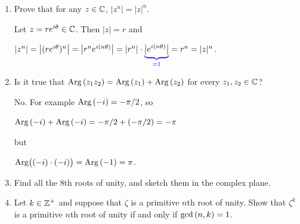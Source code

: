 \documentclass[11pt,fleqn,dvipsnames,usenames]{article}
\begin{document}
\begin{enumerate}
\item Prove that for any $z\in\mathbb{C}$, $|z^{n}| = |z|^{n}$.
\vsmsp

\solution Let $z = re^{i\theta}\in\mathbb{C}$.  Then $|z| = r$ and
\begin{center}
$|z^n| = \big|(re^{i\theta})^n\big| = \big|r^ne^{i(n\theta)}\big| = |r^n|\cdot {\color{blue}\underbrace{\color{black}\big|e^{i(n\theta)}\big|}_{=1}} = r^n  = |z|^n$.
\end{center}
\item Is it true that $\text{Arg}\left(z_1z_2\right) = \text{Arg}\left(z_1\right) + \text{Arg}\left(z_2\right)$ for every $z_{1},z_{2}\in\mathbb{C}$?
\vsmsp

\solution No.  For example $\text{Arg}\left(-i\right) = -\pi/2$, so
\begin{center}
$\text{Arg}\left(-i\right) + \text{Arg}\left(-i\right) = -\pi/2 + (-\pi/2) = -\pi$
\end{center}
but
\begin{center}
$\text{Arg}\big((-i)\cdot(-i)\big) = \text{Arg}\left(-1\right) = \pi$.
\end{center}
\item Find all the $8$th roots of unity, and sketch them in the complex plane.
\item Let $k\in\mathbb{Z}^{+}$ and suppose that $\zeta$ is a primitive $n$th root of unity.  Show that $\zeta^{k}$ is a primitive $n$th root of unity if and only if $\text{gcd}\left(n,k\right) = 1$.
\end{enumerate}
\end{document}
